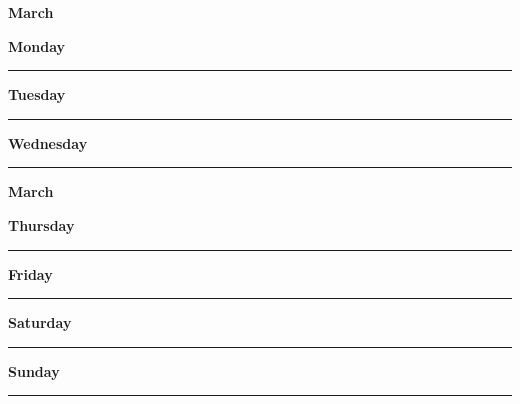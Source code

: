 \newpage

\textbf{\Large{March} \hfill \Large{}}
\vspace{0.3cm}

\begin{daybox}
 \textbf{Monday} \\
\rule{\linewidth}{0.02cm}
\end{daybox}

\begin{daybox}
\textbf{Tuesday} \\
\rule{\linewidth}{0.02cm}
\end{daybox}

\begin{daybox}
\textbf{Wednesday} \\
\rule{\linewidth}{0.02cm}
\end{daybox}

\newpage

\textbf{\Large{March} \hfill \Large{}}
\vspace{0.3cm}

\begin{daybox}
\textbf{Thursday} \\
\rule{\linewidth}{0.02cm}
\end{daybox}

\begin{daybox}
\textbf{Friday} \\
\rule{\linewidth}{0.02cm}
\end{daybox}

\begin{weekendbox}
\textbf{Saturday} \\
\rule{\linewidth}{0.02cm}
\tcblower
{}
\textbf{Sunday} \\
\rule{\linewidth}{0.02cm}
\end{weekendbox}
